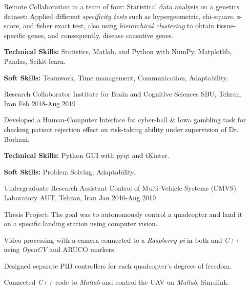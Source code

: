 \begin{cventries}
{\begin{cvitems}
        \item{Remote Collaboration in a team of four: Statistical data analysis on a genetics dataset: Applied different \textit{specificity tests} such as hypergeometric, chi-square, z-score, and fisher exact test, also using \textit{hierarchical clustering} to obtain tissue-specific genes, and consequently, disease causative genes.}
        \item {\textbf{Technical Skills:} Statistics, Matlab, and Python with NumPy, Matplotlib, Pandas, Scikit-learn.}
        \item {\textbf{Soft Skills:} Teamwork, Time management, Communication, Adaptability.}
      \end{cvitems}
    }
  \cventry
    {Research Collaborator}  %
    {Institute for Brain and Cognitive Sciences} %
    {SBU, Tehran, Iran} %
    {Feb 2018-Aug 2019} %
    {
      \begin{cvitems} %
        \item{Developed a Human-Computer Interface for cyber-ball \& Iowa gambling task for checking patient rejection effect on risk-taking ability under supervision of Dr. Borhani.}
        \item {\textbf{Technical Skills:} Python GUI with pyqt and tKinter.}
        \item {\textbf{Soft Skills:} Problem Solving, Adaptability.}
      \end{cvitems}
    }
  \cventry
    {Undergraduate Research Assistant}  %
    {Control of Multi-Vehicle Systems (CMVS) Laboratory} %
    {AUT, Tehran, Iran} %
    {Jan 2016-Aug 2019} %
    {
      \begin{cvitems} %
            \item{Thesis Project: The goal was to autonomously control a quadcopter and land it on a specific landing station using computer vision.}
          \item{Video processing with a camera connected to a \textit{Raspberry pi} in both  and \textit{C++ } using \textit{OpenCV} and ARUCO markers.}
          \item{Designed separate PID controllers for each quadcopter's degrees of freedom.}
          \item{Connected \textit{C++ }code to \textit{Matlab} and control the UAV  on \textit{Matlab}, Simulink.}

\end{cvitems}}
\end{cventries}
